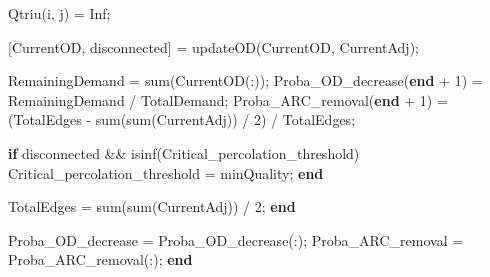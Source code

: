 \documentclass[
  letterpaper,
  DIV=11,
  numbers=noendperiod]{scrartcl}
\newenvironment{Shaded}{\begin{snugshade}}{\end{snugshade}}
\newcommand{\FloatTok}[1]{\textcolor[rgb]{0.68,0.00,0.00}{#1}}
\newcommand{\KeywordTok}[1]{\textcolor[rgb]{0.00,0.23,0.31}{\textbf{#1}}}
\newcommand{\NormalTok}[1]{\textcolor[rgb]{0.00,0.23,0.31}{#1}}
\newcommand{\OperatorTok}[1]{\textcolor[rgb]{0.37,0.37,0.37}{#1}}
\newcommand{\VariableTok}[1]{\textcolor[rgb]{0.07,0.07,0.07}{#1}}
\begin{document}
\begin{Shaded}
\begin{Highlighting}[]
        \VariableTok{Qtriu}\NormalTok{(}\VariableTok{i}\OperatorTok{,} \VariableTok{j}\NormalTok{) }\OperatorTok{=} \VariableTok{Inf}\OperatorTok{;}

\NormalTok{        [}\VariableTok{CurrentOD}\OperatorTok{,} \VariableTok{disconnected}\NormalTok{] }\OperatorTok{=} \VariableTok{updateOD}\NormalTok{(}\VariableTok{CurrentOD}\OperatorTok{,} \VariableTok{CurrentAdj}\NormalTok{)}\OperatorTok{;}

        \VariableTok{RemainingDemand} \OperatorTok{=} \VariableTok{sum}\NormalTok{(}\VariableTok{CurrentOD}\NormalTok{(}\OperatorTok{:}\NormalTok{))}\OperatorTok{;}
        \VariableTok{Proba\_OD\_decrease}\NormalTok{(}\KeywordTok{end} \OperatorTok{+} \FloatTok{1}\NormalTok{) }\OperatorTok{=} \VariableTok{RemainingDemand} \OperatorTok{/} \VariableTok{TotalDemand}\OperatorTok{;}
        \VariableTok{Proba\_ARC\_removal}\NormalTok{(}\KeywordTok{end} \OperatorTok{+} \FloatTok{1}\NormalTok{) }\OperatorTok{=}\NormalTok{ (}\VariableTok{TotalEdges} \OperatorTok{{-}} \VariableTok{sum}\NormalTok{(}\VariableTok{sum}\NormalTok{(}\VariableTok{CurrentAdj}\NormalTok{)) }\OperatorTok{/} \FloatTok{2}\NormalTok{) }\OperatorTok{/} \VariableTok{TotalEdges}\OperatorTok{;}

        \KeywordTok{if} \VariableTok{disconnected} \OperatorTok{\&\&} \VariableTok{isinf}\NormalTok{(}\VariableTok{Critical\_percolation\_threshold}\NormalTok{)}
            \VariableTok{Critical\_percolation\_threshold} \OperatorTok{=} \VariableTok{minQuality}\OperatorTok{;}
        \KeywordTok{end}

        \VariableTok{TotalEdges} \OperatorTok{=} \VariableTok{sum}\NormalTok{(}\VariableTok{sum}\NormalTok{(}\VariableTok{CurrentAdj}\NormalTok{)) }\OperatorTok{/} \FloatTok{2}\OperatorTok{;}
    \KeywordTok{end}

    \VariableTok{Proba\_OD\_decrease} \OperatorTok{=} \VariableTok{Proba\_OD\_decrease}\NormalTok{(}\OperatorTok{:}\NormalTok{)}\OperatorTok{;}
    \VariableTok{Proba\_ARC\_removal} \OperatorTok{=} \VariableTok{Proba\_ARC\_removal}\NormalTok{(}\OperatorTok{:}\NormalTok{)}\OperatorTok{;}
\KeywordTok{end}
\end{Highlighting}
\end{Shaded}
\end{document}
